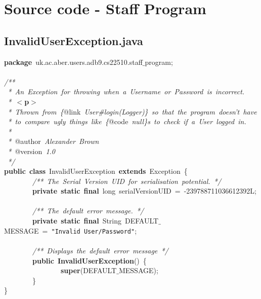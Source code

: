 \section{Source code - Staff Program}
\normalsize
\rmfamily
\subsection{InvalidUserException.java}
\scriptsize
\sffamily
\noindent
\mbox{}\textbf{package}\ uk.ac.aber.users.adb9.cs22510.staff$\_$program; \\
\mbox{} \\
\mbox{}\textit{/**} \\
\mbox{}\textit{\ *\ An\ Exception\ for\ throwing\ when\ a\ Username\ or\ Password\ is\ incorrect.} \\
\mbox{}\textit{\ *\ }\textbf{$<$p$>$} \\
\mbox{}\textit{\ *\ Thrown\ from\ \{}@link\textit{\ User\#login(Logger)\}\ so\ that\ the\ program\ doesn't\ have} \\
\mbox{}\textit{\ *\ to\ compare\ ugly\ things\ like\ \{}@code\textit{\ null\}s\ to\ check\ if\ a\ User\ logged\ in.} \\
\mbox{}\textit{\ *\ } \\
\mbox{}\textit{\ *\ }@author\textit{\ Alexander\ Brown} \\
\mbox{}\textit{\ *\ }@version\textit{\ 1.0} \\
\mbox{}\textit{\ */} \\
\mbox{}\textbf{public}\ \textbf{class}\ InvalidUserException\ \textbf{extends}\ Exception\ \{ \\
\mbox{}\ \ \ \ \ \ \ \ \textit{/**\ The\ Serial\ Version\ UID\ for\ serialisation\ potential.\ */} \\
\mbox{}\ \ \ \ \ \ \ \ \textbf{private}\ \textbf{static}\ \textbf{final}\ long\ serialVersionUID\ =\ -239788711036612392L; \\
\mbox{}\ \ \ \ \ \ \ \  \\
\mbox{}\ \ \ \ \ \ \ \ \textit{/**\ The\ default\ error\ message.\ */} \\
\mbox{}\ \ \ \ \ \ \ \ \textbf{private}\ \textbf{static}\ \textbf{final}\ String\ DEFAULT$\_$MESSAGE\ =\ \texttt{"{}Invalid\ User/Password"{}}; \\
\mbox{}\ \ \ \ \ \ \ \  \\
\mbox{}\ \ \ \ \ \ \ \ \textit{/**\ Displays\ the\ default\ error\ message\ */} \\
\mbox{}\ \ \ \ \ \ \ \ \textbf{public}\ \textbf{InvalidUserException}()\ \{ \\
\mbox{}\ \ \ \ \ \ \ \ \ \ \ \ \ \ \ \ \textbf{super}(DEFAULT$\_$MESSAGE); \\
\mbox{}\ \ \ \ \ \ \ \ \} \\
\mbox{}\} \\

